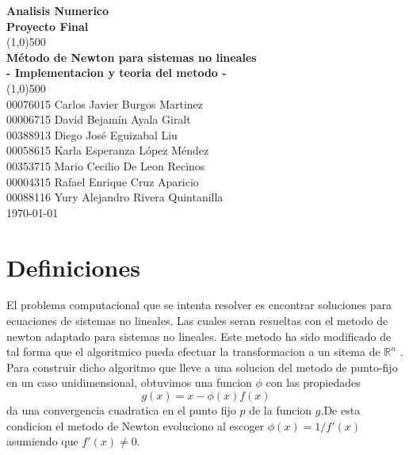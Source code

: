 \documentclass[11pt]{article}
\begin{document}
\begin{titlepage}

\begin{center}
\Large{\textbf{Analisis Numerico}}\\
\Large{\textbf{Proyecto Final}}\\
\vfill
\line(1,0){500}\\[1mm]

\huge{\textbf{Método de Newton para sistemas no lineales}}\\[3mm]
\Large{\textbf{- Implementacion y teoria del metodo -}}\\[1mm]

\line(1,0){500}\\
\vfill
00076015 Carlos Javier Burgos Martinez\\
00006715 David Bejamín Ayala Giralt\\
00388913 Diego José Eguizabal Liu\\
00058615 Karla Esperanza López Méndez\\
00353715 Mario Cecilio De Leon Recinos\\
00004315 Rafael Enrique Cruz Aparicio \\
00088116 Yury Alejandro Rivera Quintanilla\\
\vfill
\today\\

\end{center}

\end{titlepage}

\tableofcontents
\thispagestyle{empty}
\clearpage

\setcounter{page}{1}

\section{Definiciones}

El problema computacional que se intenta resolver es encontrar soluciones para ecuaciones de sistemas no lineales. Las cuales seran resueltas con el metodo de newton adaptado para sistemas no lineales. Este metodo ha sido modificado de tal forma que el algoritmico
pueda efectuar la transformacion a un sitema de $\mathbb{R}^{n}$ .\\

Para construir dicho algoritmo que lleve a una solucion del metodo de punto-fijo en un caso unidimensional, obtuvimos una funcion $\phi$ con las propiedades $$g(x)=x-\phi(x)f(x)$$ da una convergencia cuadratica en el punto fijo $p$ de la funcion $g$.De esta condicion el metodo de Newton evoluciono al escoger $\phi(x)=1/f'(x)$ asumiendo que $f'(x)\neq0$.\\
\end{document}
